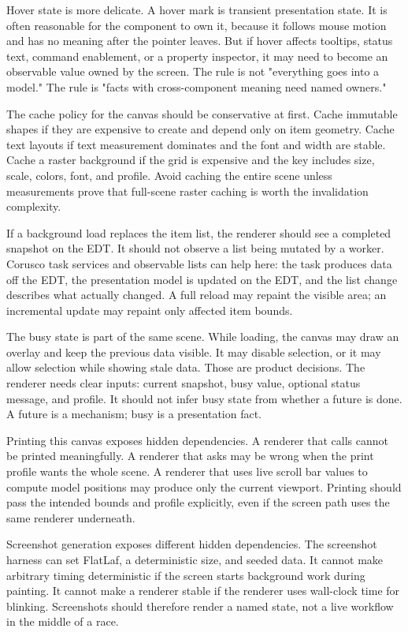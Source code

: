 Hover state is more delicate. A hover mark is transient presentation state. It is often reasonable for the component to own it, because it follows mouse motion and has no meaning after the pointer leaves. But if hover affects tooltips, status text, command enablement, or a property inspector, it may need to become an observable value owned by the screen. The rule is not "everything goes into a model." The rule is "facts with cross-component meaning need named owners."

The cache policy for the canvas should be conservative at first. Cache immutable shapes if they are expensive to create and depend only on item geometry. Cache text layouts if text measurement dominates and the font and width are stable. Cache a raster background if the grid is expensive and the key includes size, scale, colors, font, and profile. Avoid caching the entire scene unless measurements prove that full-scene raster caching is worth the invalidation complexity.

If a background load replaces the item list, the renderer should see a completed snapshot on the EDT. It should not observe a list being mutated by a worker. Corusco task services and observable lists can help here: the task produces data off the EDT, the presentation model is updated on the EDT, and the list change describes what actually changed. A full reload may repaint the visible area; an incremental update may repaint only affected item bounds.

The busy state is part of the same scene. While loading, the canvas may draw an overlay and keep the previous data visible. It may disable selection, or it may allow selection while showing stale data. Those are product decisions. The renderer needs clear inputs: current snapshot, busy value, optional status message, and profile. It should not infer busy state from whether a future is done. A future is a mechanism; busy is a presentation fact.

Printing this canvas exposes hidden dependencies. A renderer that calls  cannot be printed meaningfully. A renderer that asks  may be wrong when the print profile wants the whole scene. A renderer that uses live scroll bar values to compute model positions may produce only the current viewport. Printing should pass the intended bounds and profile explicitly, even if the screen path uses the same renderer underneath.

Screenshot generation exposes different hidden dependencies. The screenshot harness can set FlatLaf, a deterministic size, and seeded data. It cannot make arbitrary timing deterministic if the screen starts background work during painting. It cannot make a renderer stable if the renderer uses wall-clock time for blinking. Screenshots should therefore render a named state, not a live workflow in the middle of a race.

